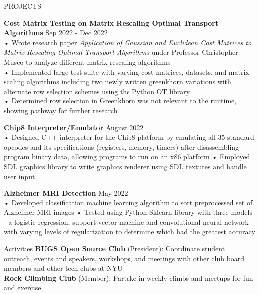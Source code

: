\documentclass{resume} %
\begin{document}
\begin{rSection}{PROJECTS}

\textbf{Cost Matrix Testing on Matrix Rescaling Optimal Transport Algorithms} \hfill Sep 2022 - Dec 2022 \\
• Wrote research paper \emph{Application of Gaussian and Euclidean Cost Matrices to Matrix Rescaling Optimal Transport Algorithms} under Professor Christopher Musco to analyze different matrix rescaling algorithms\\ 
• Implemented large test suite with varying cost matrices, datasets, and matrix scaling algorithms including two newly written greenkhorn variations with alternate row selection schemes using the Python OT library \\ 
• Determined row selection in Greenkhorn was not relevant to the runtime, showing pathway for further research

\textbf{Chip8 Interpreter/Emulator } \hfill August 2022 \\
• Designed C++ interpreter for the Chip8 platform by emulating all 35 standard opcodes and its specifications (registers, memory, timers) after disassembling program binary data, allowing programs to run on an x86 platform \newline
• Employed SDL graphics library to write graphics renderer using SDL textures and handle user input \smallskip

\textbf{Alzheimer MRI Detection } \hfill May 2022 \\
• Developed classification machine learning algorithm to sort preprocessed set of Alzheimer MRI images
\newline
• Tested using Python Sklearn library with three models - a logistic regression, support vector machine and convolutional neural network - with varying levels of regularization to determine which had the greatest accuracy 


\end{rSection}

\begin{rSection}{Activities}
\textbf{BUGS Open Source Club} (President): Coordinate student outreach, events and speakers, workshops, and meetings with other club board members and other tech clubs at NYU\\
\textbf{Rock Climbing Club} (Member): Partake in weekly climbs and meetups for fun and exercise

\end{rSection}
\end{document}
